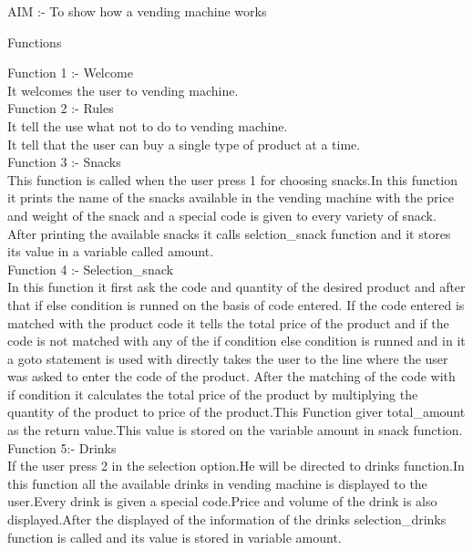 \documentclass[10pt,a4paper]{article}
\begin{document}
\pagestyle{fancy}
\fancyfoot{}
\fancyfoot[R]{\thepage}
\begin{flushleft}
AIM :- To show how a vending machine works\\
\bigskip
\begin{center}
Functions
\end{center}
Function 1 :- Welcome\\
It welcomes the user to vending machine.\\ 
\bigskip
Function 2 :- Rules\\
It tell the use what not to do to vending machine.\\
It tell that the user can buy a single type of product at a time.\\
\bigskip
Function 3 :- Snacks\\
This function is called when the user press 1 for choosing snacks.In this function it prints the name of the snacks available in the vending machine with the price and weight of the snack and a special code is given to every variety of snack. After printing the available snacks it calls selction\_snack function and it stores its value in a variable called amount.\\
\bigskip
Function 4 :- Selection\_snack\\
In this function it first ask the code and quantity of the desired product and after that if else condition is runned on the basis of code entered. If the code entered is matched with the product code it tells the total price of the product and if the code is not matched with any of the if condition else condition is runned and in it a goto statement is used with directly takes the user to the line where the user was asked to enter the code of the product.
After the matching of the code with if condition it calculates the total price of the product by multiplying the quantity of the product to price of the product.This Function giver total\_amount as the return value.This value is stored on the variable amount in snack function.\\
\bigskip
Function 5:- Drinks\\
If the user press 2 in the selection option.He will be directed to drinks function.In this function all the available drinks in vending machine is displayed to the user.Every drink is given a special code.Price and volume of the drink is also displayed.After the displayed of the information of the drinks selection\_drinks function is called and its value is stored in variable amount.\\

\end{flushleft}
\end{document}
